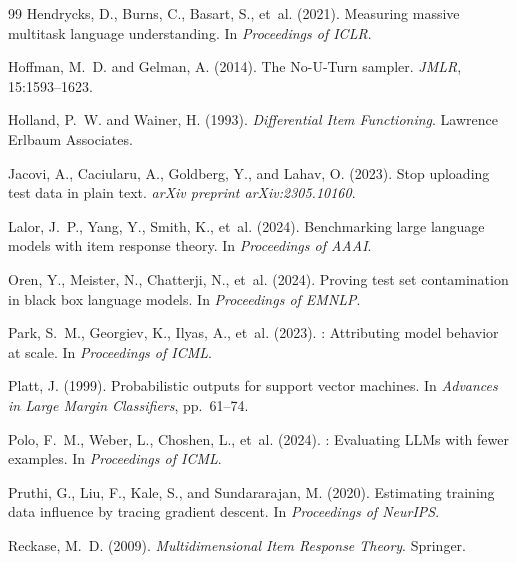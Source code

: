 \documentclass[11pt]{article}
\begin{document}
\begin{thebibliography}{99}
Hendrycks, D., Burns, C., Basart, S., et~al. (2021).
\newblock Measuring massive multitask language understanding.
\newblock In \emph{Proceedings of ICLR}.

Hoffman, M.~D. and Gelman, A. (2014).
\newblock The {No-U-Turn} sampler.
\newblock \emph{JMLR}, 15:1593--1623.

Holland, P.~W. and Wainer, H. (1993).
\newblock \emph{Differential Item Functioning}.
\newblock Lawrence Erlbaum Associates.

Jacovi, A., Caciularu, A., Goldberg, Y., and Lahav, O. (2023).
\newblock Stop uploading test data in plain text.
\newblock \emph{arXiv preprint arXiv:2305.10160}.

Lalor, J.~P., Yang, Y., Smith, K., et~al. (2024).
\newblock Benchmarking large language models with item response theory.
\newblock In \emph{Proceedings of AAAI}.

Oren, Y., Meister, N., Chatterji, N., et~al. (2024).
\newblock Proving test set contamination in black box language models.
\newblock In \emph{Proceedings of EMNLP}.

Park, S.~M., Georgiev, K., Ilyas, A., et~al. (2023).
: Attributing model behavior at scale.
\newblock In \emph{Proceedings of ICML}.

Platt, J. (1999).
\newblock Probabilistic outputs for support vector machines.
\newblock In \emph{Advances in Large Margin Classifiers}, pp.~61--74.

Polo, F.~M., Weber, L., Choshen, L., et~al. (2024).
: Evaluating {LLMs} with fewer examples.
\newblock In \emph{Proceedings of ICML}.

Pruthi, G., Liu, F., Kale, S., and Sundararajan, M. (2020).
\newblock Estimating training data influence by tracing gradient descent.
\newblock In \emph{Proceedings of NeurIPS}.

Reckase, M.~D. (2009).
\newblock \emph{Multidimensional Item Response Theory}.
\newblock Springer.


\end{thebibliography}
\end{document}
